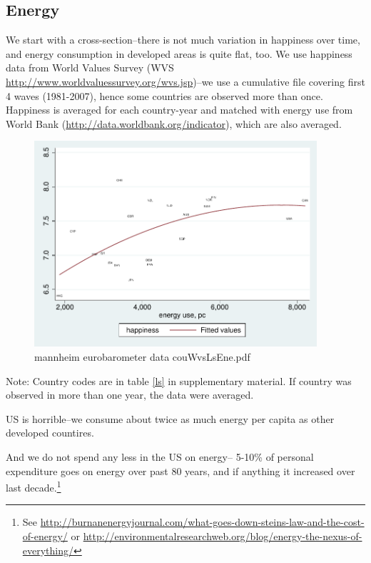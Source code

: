 \documentclass[10pt, letterpaper]{article}
\begin{document}
\begin{spacing}{1.4}

\subsection{Energy}

We start with a cross-section--there is not much variation in happiness over
time, and energy consumption in developed areas is quite flat, too. 
We use happiness data from World Values Survey
(WVS \url{http://www.worldvaluessurvey.org/wvs.jsp})--we use a cumulative file
covering first 4 waves (1981-2007), hence some countries are observed more than
once. Happiness is averaged for each country-year and matched with energy use
 from World Bank (\url{http://data.worldbank.org/indicator}), which are also averaged. 

\begin{figure}[H]
 \includegraphics[height=3in]{graphsAndTables/couWvsLsEne.pdf}\centering
\caption{mannheim eurobarometer data couWvsLsEne.pdf}\label{couWvsLsEne.pdf}
\end{figure}
{\scriptsize Note: Country codes are in table \ref{ls} in supplementary
  material. If country was observed in more than one year, the data were averaged.}

US is horrible--we consume about twice as much energy per capita as other
developed countires. %

And we do not spend any less in the US on energy-- 5-10\% of personal
expenditure goes on energy over past 80 years, and if anything it increased over
last decade.\footnote{See
  \url{http://burnanenergyjournal.com/what-goes-down-steins-law-and-the-cost-of-energy/}
or \url{http://environmentalresearchweb.org/blog/energy-the-nexus-of-everything/}}


\end{spacing}
\end{document}
